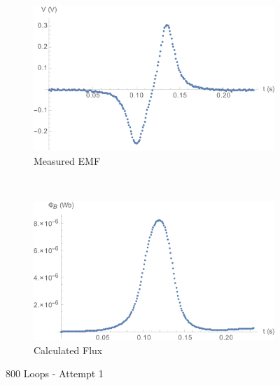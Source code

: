 \documentclass[a4paper]{scrartcl}
\begin{document}
\begin{figure}[p]
    \centering
    \begin{subfigure}[b]{0.45\textwidth}
        \includegraphics[width = \textwidth]{800_1_voltage.png}
        \caption{Measured EMF}
    \end{subfigure}
    ~
    \begin{subfigure}[b]{0.45\textwidth}
        \includegraphics[width = \textwidth]{800_1_flux.png}
        \caption{Calculated Flux}
    \end{subfigure}
    \caption{800 Loops - Attempt 1}
    \label{fig:800_1}
\end{figure}
\end{document}
